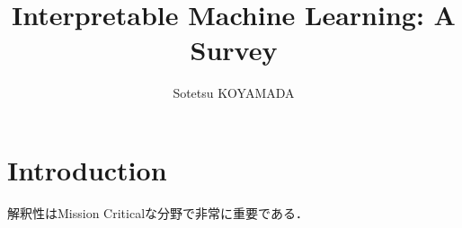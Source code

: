 \documentclass{jsarticle}
\title{Interpretable Machine Learning: A Survey}
\author{Sotetsu KOYAMADA}
\begin{document}
\maketitle

\section{Introduction}
解釈性はMission Criticalな分野で非常に重要である．
\end{document}
